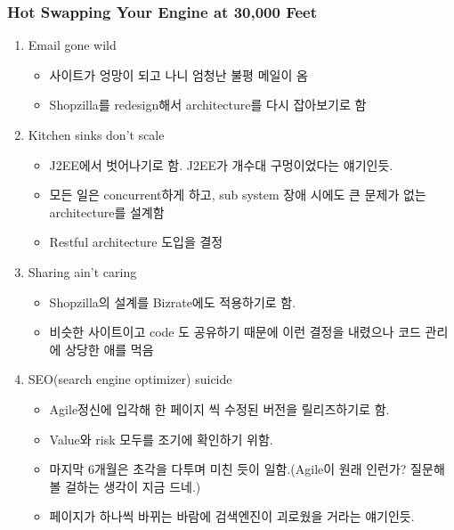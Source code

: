 \begin{frame}
\frametitle{Hot Swapping Your Engine at 30,000 Feet}

\begin{enumerate}
\item Email gone wild
    \begin{itemize}
    \item 사이트가 엉망이 되고 나니 엄청난 불평 메일이 옴
    \item Shopzilla를 redesign해서 architecture를 다시 잡아보기로 함
    \end{itemize}
\item Kitchen sinks don't scale
    \begin{itemize}
    \item J2EE에서 벗어나기로 함. J2EE가 개수대 구멍이었다는 얘기인듯.
    \item 모든 일은 concurrent하게 하고, sub system 장애 시에도 큰 문제가 없는 architecture를 설계함
    \item Restful architecture 도입을 결정
    \end{itemize}
\item Sharing ain't caring
    \begin{itemize}
    \item Shopzilla의 설계를 Bizrate에도 적용하기로 함.
    \item 비슷한 사이트이고 code 도 공유하기 때문에 이런 결정을 내렸으나 코드 관리에 상당한 애를 먹음
    \end{itemize}
\item SEO(search engine optimizer) suicide
    \begin{itemize}
    \item Agile정신에 입각해 한 페이지 씩 수정된 버전을 릴리즈하기로 함.
    \item Value와 risk 모두를 조기에 확인하기 위함.
    \item 마지막 6개월은 초각을 다투며 미친 듯이 일함.(Agile이 원래 인런가? 질문해 볼 걸하는 생각이 지금 드네.)
    \item 페이지가 하나씩 바뀌는 바람에 검색엔진이 괴로웠을 거라는 얘기인듯.
    \end{itemize}
\end{enumerate}

\end{frame}
